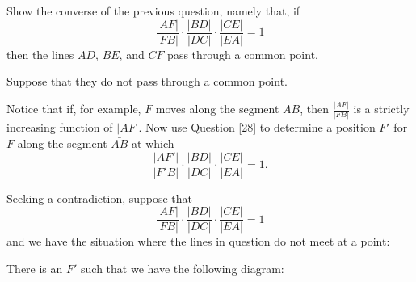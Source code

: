 \documentclass{ximera}
\begin{document}
\begin{question}
Show the converse of the previous question, namely that, if%
\[
\frac{|AF|}{|FB|}\cdot\frac{|BD|}{|DC|}\cdot\frac{|CE|}{|EA|}=1
\]
then the lines $AD$, $BE$, and $CF$ pass through a common point.
\begin{solution}
\begin{hint}
Suppose that they do not pass through a common point.
\begin{image}
\end{image}
\end{hint}
\begin{hint}
Notice that if, for example, $F$ moves along the segment $\bar{AB}$,
then $\frac{|AF|}{|FB|}$ is a strictly increasing function of
$|AF|$. Now use Question \ref{28} to determine a position $F'$ for $F$
along the segment $\bar{AB}$ at which
\[
\frac{|AF'|}{|F'B|}\cdot\frac{|BD|}{|DC|}\cdot\frac{|CE|}{|EA|}=1.
\]
\end{hint}
\begin{freeResponse}
Seeking a contradiction, suppose that 
\[
\frac{|AF|}{|FB|}\cdot\frac{|BD|}{|DC|}\cdot\frac{|CE|}{|EA|}=1
\]
and we have the situation where the lines in question do not meet at a point:
\begin{image}
\end{image}
There is an $F'$ such that we have the following diagram:



\end{freeResponse}
\end{solution}
\end{question}
\end{document}
